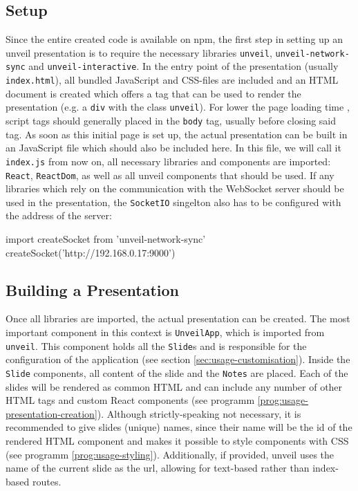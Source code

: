 \subsection{Setup}
\label{sec:usage-setup}

Since the entire created code is available on npm, the first step in setting up an unveil presentation is to require the necessary libraries \texttt{unveil}, \texttt{unveil-network-sync} and \texttt{unveil-interactive}. In the entry point of the presentation (usually \texttt{index.html}), all bundled JavaScript and CSS-files are included and an HTML document is created which offers a tag that can be used to render the presentation (e.g. a \texttt{div} with the class \texttt{unveil}). For lower the page loading time \cite{yahoo-speeding-up-website}, script tags should generally placed in the \texttt{body} tag, usually before closing said tag.
As soon as this initial page is set up, the actual presentation can be built in an JavaScript file which should also be included here.
In this file, we will call it \texttt{index.js} from now on, all necessary libraries and components are imported:  \texttt{React}, \texttt{ReactDom}, as well as all unveil components that should be used. If any libraries which rely on the communication with the WebSocket server should be used in the presentation, the \texttt{SocketIO} singelton also has to be configured with the address of the server:
\begin{GenericCode}
import { createSocket } from 'unveil-network-sync'
createSocket('http://192.168.0.17:9000')
\end{GenericCode}

\subsection{Building a Presentation}
\label{sec:usage-components}

Once all libraries are imported, the actual presentation can be created. The most important component in this context is \texttt{UnveilApp}, which is imported from \texttt{unveil}. This component holds all the \texttt{Slide}s and is responsible for the configuration of the application (see section \ref{sec:usage-customisation}). Inside the \texttt{Slide} components, all content of the slide and the \texttt{Notes} are placed. Each of the slides will be rendered as common HTML and can include any number of other HTML tags and custom React components (see programm \ref{prog:usage-presentation-creation}). Although strictly-speaking not necessary, it is recommended to give slides (unique) names, since their name will be the id of the rendered HTML component and makes it possible to style components with CSS (see programm \ref{prog:usage-styling}). Additionally, if provided, unveil uses the name of the current slide as the url, allowing for text-based rather than index-based routes.


